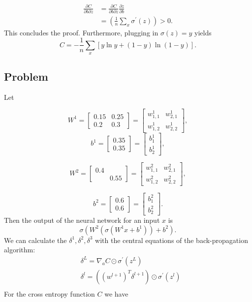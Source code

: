 \documentclass{article}
\begin{document}
$$
\begin{aligned}
	\frac{\partial C}{\partial b\partial z}&=\frac{\partial C}{\partial b\partial z}\frac{\partial z}{\partial b}
	\\&=\left(\frac{1}{n} \sum_x\sigma^{\prime}(z)\right)>0.
\end{aligned}
$$
This concludes the proof. Furthermore, plugging in $\sigma (z)=y$ yields 
$$
C=-\frac{1}{n} \sum_x[y \ln y+(1-y) \ln (1-y)].
$$
\subsection{Problem}
Let

$$
W^1=
\begin{bmatrix}
  0.15 & 0.25 \\
  0.2 & 0.3
\end{bmatrix}=\begin{bmatrix}
  w^1_{1,1} & w^1_{2,1} \\
  w^1_{1,2} & w^1_{2,2}
\end{bmatrix},
$$
$$
 b^1 = \begin{bmatrix}
  0.35  \\
  0.35 
\end{bmatrix}= \begin{bmatrix}
  b^1_1  \\
  b^1_2 
\end{bmatrix},
$$


$$
W^2=
\begin{bmatrix}
  0.4 &  \\
   & 0.55
\end{bmatrix}=\begin{bmatrix}
  w^2_{1,1} & w^2_{2,1} \\
  w^2_{1,2} & w^2_{2,2}
\end{bmatrix},
$$

$$
 b^2 = \begin{bmatrix}
  0.6  \\
  0.6 
\end{bmatrix}= \begin{bmatrix}
  b^2_1  \\
  b^2_2 
\end{bmatrix}.
$$
Then the output of the neural network for an input $x$ is 
$$\sigma(W^2(\sigma(W^1x+b^1))+b^2).$$
We can calculate the $\delta^1,\delta^2, \delta^3$ with the central equations of the back-propagation algorithm:
$$
\begin{aligned}
& \delta^L=\nabla_a C \odot \sigma^{\prime}\left(z^L\right) \\
& \delta^l=\left(\left(w^{l+1}\right)^T \delta^{l+1}\right) \odot \sigma^{\prime}\left(z^l\right) \\
\end{aligned}
$$
For the cross entropy function $C$ we have
\end{document}
